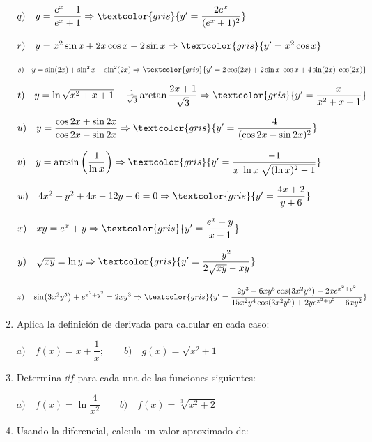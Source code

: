 \begin{enumerate}
		$q) \quad y= \dfrac {e^x-1}{e^x+1}  \Rightarrow \textcolor{gris}{ y'=\dfrac {2e^x}{(e^x+1)^2} }$
		
		$r) \quad y= x^2 \sin x + 2x \cos x -2 \sin x  \Rightarrow \textcolor{gris}{ y'= x^2\cos x}$
		
		$s) \quad y= \sin (2x) +\sin^2 x + \sin^2(2x)  \Rightarrow \textcolor{gris}{ y'= 2\cos(2x)+ 2 \sin x \; \cos x+ 4 \sin(2x) \; \cos (2x)}$
		
		$t) \quad y= \ln \sqrt{x^2+x+1}-\frac {1}{\sqrt{3}}\arctan \dfrac {2x+1}{\sqrt{3}}  \Rightarrow \textcolor{gris}{ y'= \dfrac {x}{x^2+x+1}}$

		$u) \quad y=\dfrac {\cos 2x + \sin 2x}{\cos 2x - \sin 2x}   \Rightarrow \textcolor{gris}{ y'= \dfrac {4}{(\cos 2x - \sin 2x)^2} }$
		
		$v) \quad y= \arcsin \left(\dfrac {1}{\ln x} \right)  \Rightarrow \textcolor{gris}{ y'=\dfrac {-1}{x\; \ln x \; \sqrt{(\ln x)^2-1}} }$
		
		$w) \quad 4x^2+y^2+4x-12y-6=0   \Rightarrow \textcolor{gris}{ y'= \dfrac {4x+2}{y+6}}$
		
		$x) \quad xy=e^x+y   \Rightarrow \textcolor{gris}{ y'= \dfrac {e^x-y}{x-1}}$
		
		$y) \quad \sqrt{xy}=\ln y   \Rightarrow \textcolor{gris}{ y'= \dfrac {y^2}{2\sqrt{xy}-xy}}$
		
		$z) \quad \sin(3x^2y^5)+e^{x^2+y^2}=2xy^3   \Rightarrow \textcolor{gris}{ y'= \dfrac {2y^3-6xy^5\cos(3x^2y^5)-2xe^{x^2+y^2}}{15x^2y^4\cos(3x^2y^5)+2ye^{x^2+y^2}-6xy^2} }$
		
		\item Aplica la definición de derivada para calcular en cada caso: 
		
		$a)\quad f(x)=x+\dfrac 1 x;\qquad b) \quad g(x)=\sqrt{x^2+1}$
		
		
		\item Determina $\dd f$ para cada una de las funciones siguientes:
		
		$a)\quad f(x)=\ln \dfrac {4}{x^2} \qquad b)\quad f(x)=\sqrt[3]{x^2+2}$
		
		
		\item Usando la diferencial, calcula un valor aproximado de:
		

\end{enumerate}
